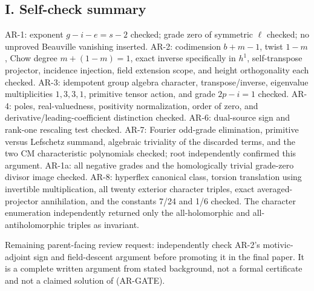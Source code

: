 \subsection{I. Self-check summary}\label{i.-self-check-summary}

AR-1: exponent \(g-i-e=s-2\) checked; grade zero of symmetric \(\ell\)
checked; no unproved Beauville vanishing inserted. AR-2: codimension
\(b+m-1\), twist \(1-m\), Chow degree \(m+(1-m)=1\), exact inverse
specifically in \(h^1\), self-transpose projector, incidence injection,
field extension scope, and height orthogonality each checked. AR-3:
idempotent group algebra character, transpose/inverse, eigenvalue
multiplicities \(1,3,3,1\), primitive tensor action, and grade
\(2p-i=1\) checked. AR-4: poles, real-valuedness, positivity
normalization, order of zero, and derivative/leading-coefficient
distinction checked. AR-6: dual-source sign and rank-one rescaling test
checked. AR-7: Fourier odd-grade elimination, primitive versus Lefschetz
summand, algebraic triviality of the discarded terms, and the two CM
characteristic polynomials checked; root independently confirmed this
argument. AR-1a: all negative grades and the homologically trivial
grade-zero divisor image checked. AR-8: hyperflex canonical class,
torsion translation using invertible multiplication, all twenty exterior
character triples, exact averaged-projector annihilation, and the
constants 7/24 and 1/6 checked. The character enumeration independently
returned only the all-holomorphic and all-antiholomorphic triples as
invariant.

Remaining parent-facing review request: independently check AR-2's
motivic-adjoint sign and field-descent argument before promoting it in
the final paper. It is a complete written argument from stated
background, not a formal certificate and not a claimed solution of
(AR-GATE).
